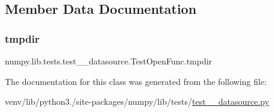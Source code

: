 \subsection{Member Data Documentation}
\mbox{\label{classnumpy_1_1lib_1_1tests_1_1test____datasource_1_1TestOpenFunc_a4c19f6468bd1f422a2fb681eaf6bde6c}} 
\subsubsection{\texorpdfstring{tmpdir}{tmpdir}}
{\footnotesize\ttfamily numpy.\+lib.\+tests.\+test\+\_\+\+\_\+datasource.\+Test\+Open\+Func.\+tmpdir}



The documentation for this class was generated from the following file\+:\begin{DoxyCompactItemize}
\item 
venv/lib/python3./site-\/packages/numpy/lib/tests/\hyperlink{test____datasource_8py}{test\+\_\+\+\_\+datasource.\+py}\end{DoxyCompactItemize}

